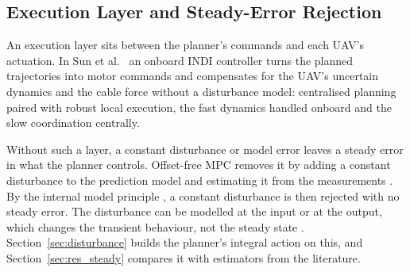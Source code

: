 \subsection{Execution Layer and Steady-Error Rejection}
\label{sec:lit_execution}

An execution layer sits between the planner's commands and each UAV's actuation. In Sun et al.\ \cite{tudelft} an onboard INDI controller \cite{smeur2016indi} turns the planned trajectories into motor commands and compensates for the UAV's uncertain dynamics and the cable force without a disturbance model: centralised planning paired with robust local execution, the fast dynamics handled onboard and the slow coordination centrally.

Without such a layer, a constant disturbance or model error leaves a steady error in what the planner controls. Offset-free MPC removes it by adding a constant disturbance to the prediction model and estimating it from the measurements \cite{muske2002disturbance, pannocchia2003disturbance, maeder2009linear}. By the internal model principle \cite{francis1976internal}, a constant disturbance is then rejected with no steady error. The disturbance can be modelled at the input or at the output, which changes the transient behaviour, not the steady state \cite{pannocchia2007combined}. Section~\ref{sec:disturbance} builds the planner's integral action on this, and Section~\ref{sec:res_steady} compares it with estimators from the literature.

